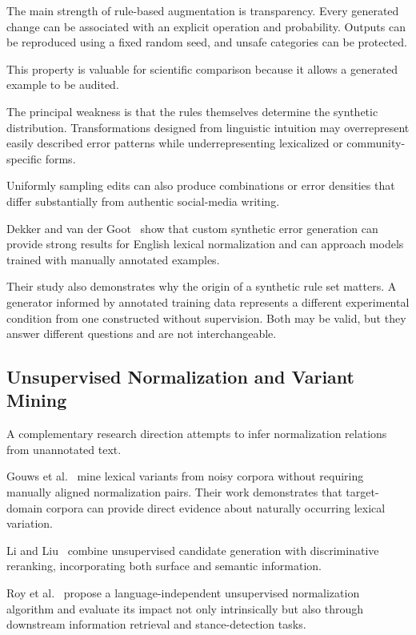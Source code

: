 \documentclass[12pt, a4paper, twoside, openany]{report}
\begin{document}
The main strength of rule-based augmentation is transparency. Every generated change can be associated with an explicit operation and probability. Outputs can be reproduced using a fixed random seed, and unsafe categories can be protected.

This property is valuable for scientific comparison because it allows a generated example to be audited.

The principal weakness is that the rules themselves determine the synthetic distribution. Transformations designed from linguistic intuition may overrepresent easily described error patterns while underrepresenting lexicalized or community-specific forms.

Uniformly sampling edits can also produce combinations or error densities that differ substantially from authentic social-media writing.

Dekker and van der Goot~\cite{dekker2020synthetic} show that custom synthetic error generation can provide strong results for English lexical normalization and can approach models trained with manually annotated examples.

Their study also demonstrates why the origin of a synthetic rule set matters. A generator informed by annotated training data represents a different experimental condition from one constructed without supervision. Both may be valid, but they answer different questions and are not interchangeable.


\subsection{Unsupervised Normalization and Variant Mining}

A complementary research direction attempts to infer normalization relations from unannotated text.

Gouws et al.~\cite{gouws2011lexical} mine lexical variants from noisy corpora without requiring manually aligned normalization pairs. Their work demonstrates that target-domain corpora can provide direct evidence about naturally occurring lexical variation.

Li and Liu~\cite{li2014normalization} combine unsupervised candidate generation with discriminative reranking, incorporating both surface and semantic information.

Roy et al.~\cite{roy2021normalization} propose a language-independent unsupervised normalization algorithm and evaluate its impact not only intrinsically but also through downstream information retrieval and stance-detection tasks.
\end{document}
